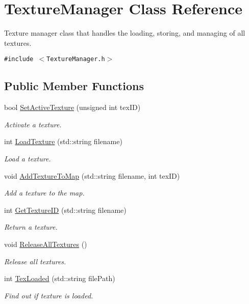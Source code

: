 \hypertarget{class_texture_manager}{
\section{TextureManager Class Reference}
\label{class_texture_manager}
}
Texture manager class that handles the loading, storing, and managing of all textures.  


{\tt \#include $<$TextureManager.h$>$}

\subsection*{Public Member Functions}
\begin{CompactItemize}
\item 
bool \hyperlink{class_texture_manager_48839479b7a9dd52b56960b584663c4c}{SetActiveTexture} (unsigned int texID)
\begin{CompactList}\small\item\em Activate a texture. \item\end{CompactList}\item 
int \hyperlink{class_texture_manager_f36ff195338c11f9e39e0b773d7c71e2}{LoadTexture} (std::string filename)
\begin{CompactList}\small\item\em Load a texture. \item\end{CompactList}\item 
void \hyperlink{class_texture_manager_6e3172f00d0eacef527ee64a0a76622f}{AddTextureToMap} (std::string filename, int texID)
\begin{CompactList}\small\item\em Add a texture to the map. \item\end{CompactList}\item 
int \hyperlink{class_texture_manager_5dbb010f1a5779a8231e3aa02c1ccc0e}{GetTextureID} (std::string filename)
\begin{CompactList}\small\item\em Return a texture. \item\end{CompactList}\item 
void \hyperlink{class_texture_manager_d8dca8bd689671a1186a093ae54c57d3}{ReleaseAllTextures} ()
\begin{CompactList}\small\item\em Release all textures. \item\end{CompactList}\item 
int \hyperlink{class_texture_manager_d8ff7cb104088eaa2099f59f179aa92e}{TexLoaded} (std::string filePath)
\begin{CompactList}\small\item\em Find out if texture is loaded. \item\end{CompactList}\end{CompactItemize}
